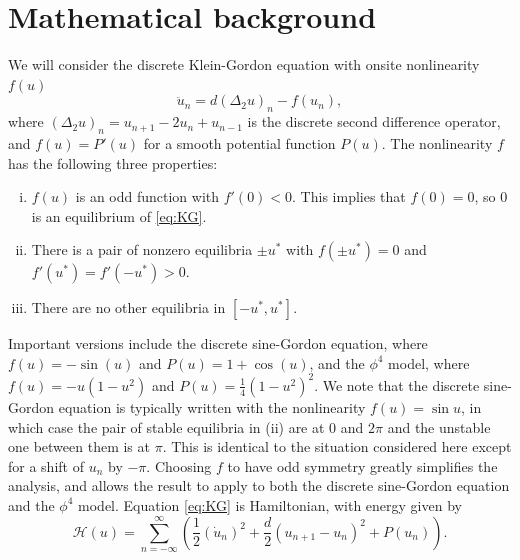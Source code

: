 \documentclass[12pt,reqno]{amsart}
\begin{document}
\section{Mathematical background}\label{sec:bg}

We will consider the discrete Klein-Gordon equation with onsite nonlinearity $f(u)$
\begin{equation}\label{eq:KG}
\ddot{u}_n = d (\Delta_2 u)_n - f(u_n),
\end{equation}
where $(\Delta_2 u)_n = u_{n+1} - 2 u_n + u_{n-1}$ is the discrete second difference operator, and $f(u) = P'(u)$ for a smooth potential function $P(u)$. The nonlinearity $f$ has the following three properties:
\begin{enumerate}[(i)]
	\item {$f(u)$ is an odd function with $f'(0) < 0$. This implies that $f(0) = 0$, so 0 is an equilibrium of \cref{eq:KG}.}
	\item There is a pair of nonzero equilibria $\pm u^*$ with $f(\pm u^*) = 0$ and $f'(u^*) = f'(-u^*) > 0$.
	\item There are no other equilibria in $[-u^*, u^*]$.
\end{enumerate}
Important versions include the discrete sine-Gordon equation, where $f(u) = -\sin(u)$ and $P(u) = 1 + \cos(u)$, and the $\phi^4$ model, where $f(u) = -u(1-u^2)$ and $P(u) = \frac{1}{4}(1-u^2)^2$.
We note that the discrete sine-Gordon equation is typically written with the nonlinearity $f(u) = \sin u$, in which case the pair of stable
equilibria in (ii) are at 0 and $2 \pi$ and the unstable one between them
is at $\pi$. This is identical to the situation considered here except for a shift of $u_n$ by $-\pi$. Choosing $f$ to have odd symmetry greatly simplifies the analysis, and allows the result to apply to both the discrete sine-Gordon equation and the $\phi^4$ model.
Equation \cref{eq:KG} is Hamiltonian, with energy given by \cite{KevrekidisWeinstein2000}
\begin{equation}\label{eq:H}
	\mathcal{H}(u) = \sum_{n=-\infty}^\infty 
	\left( \frac{1}{2} (\dot{u}_n)^2 + \frac{d}{2} (u_{n+1} - u_n)^2 + P(u_n) \right).
\end{equation}
\end{document}
